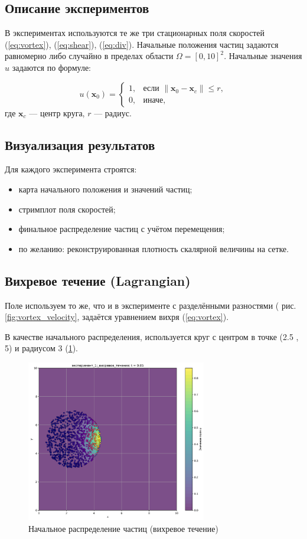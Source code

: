 \subsection{Описание экспериментов}

В экспериментах используются те же три стационарных поля скоростей (\ref{eq:vortex}), (\ref{eq:shear}), (\ref{eq:div}). Начальные положения частиц задаются равномерно либо случайно в пределах области \(\Omega = [0, 10]^2\). Начальные значения \( u \) задаются по формуле:

\[
u(\mathbf{x}_0) =
\begin{cases}
	1, & \text{если } \| \mathbf{x}_0 - \mathbf{x}_c \| \leq r, \\
	0, & \text{иначе},
\end{cases}
\]
где \(\mathbf{x}_c\) — центр круга, \(r\) — радиус.

\subsection{Визуализация результатов}

Для каждого эксперимента строятся:
\begin{itemize}
	\item карта начального положения и значений частиц;
	\item стримплот поля скоростей;
	\item финальное распределение частиц с учётом перемещения;
	\item по желанию: реконструированная плотность скалярной величины на сетке.
\end{itemize}

\subsection{Вихревое течение (Lagrangian)}
Поле используем то же, что и в эксперименте с разделёнными разностями ( рис. \ref{fig:vortex_velocity},  задаётся уравнением вихря (\ref{eq:vortex}).

В качестве начального распределения, используется круг с центром в точке (2.5 , 5) и радиусом 3 (\ref{fig:lg_vortex_begin}).
\begin{figure}
	\centering
	\includegraphics[width=0.7\textwidth]{imgs/lg/эксперимент_1:_вихревое_течение_t0.05.png}
	\caption{Начальное распределение частиц (вихревое течение)}
	\label{fig:lg_vortex_begin}
\end{figure}

